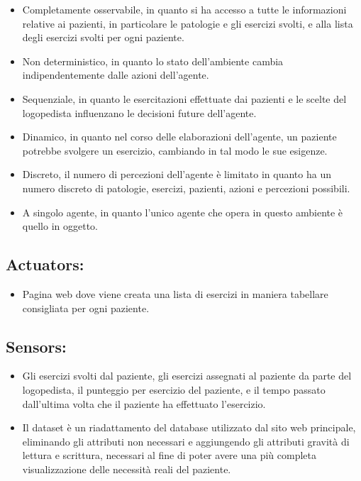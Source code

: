 \documentclass{article}
\begin{document}
    \begin{itemize}
        \item Completamente osservabile, in quanto si ha accesso a tutte le informazioni relative ai pazienti, in particolare le patologie e gli esercizi svolti, e alla lista degli esercizi svolti per ogni paziente.
        \item Non deterministico, in quanto lo stato dell’ambiente cambia indipendentemente dalle azioni dell’agente.
        \item Sequenziale, in quanto le esercitazioni effettuate dai pazienti e le scelte del logopedista influenzano le decisioni future dell’agente.
        \item Dinamico, in quanto nel corso delle elaborazioni dell’agente, un paziente potrebbe svolgere un esercizio, cambiando in tal modo le sue esigenze.
        \item Discreto, il numero di percezioni dell’agente è limitato in quanto ha un numero discreto di patologie, esercizi, pazienti, azioni e percezioni possibili.
        \item A singolo agente, in quanto l’unico agente che opera in questo ambiente è quello in oggetto.
    \end{itemize}

    \subsection{Actuators:}

    \begin{itemize}
        \item Pagina web dove viene creata una lista di esercizi in maniera tabellare consigliata per ogni paziente.
    \end{itemize}

    \subsection{Sensors:}

    \begin{itemize}
        \item Gli esercizi svolti dal paziente, gli esercizi assegnati al paziente da parte del logopedista, il punteggio per esercizio del paziente, e il tempo passato dall'ultima volta che il paziente ha effettuato l'esercizio.

        \item Il dataset è un riadattamento del database utilizzato dal sito web principale, eliminando gli attributi non necessari e aggiungendo gli attributi gravità di lettura e scrittura, necessari al fine di poter avere una più completa visualizzazione delle necessità reali del paziente.

    \end{itemize}
\end{document}
